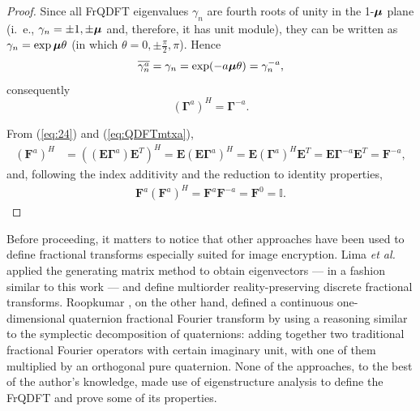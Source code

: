 \begin{itemize}
\begin{proof}
Since all FrQDFT eigenvalues $ \gamma_n $ are fourth roots of unity in the 1-$\boldsymbol{\mu} $ plane (i.~e., $ \gamma_n = \pm 1, \pm \boldsymbol{\mu} $ and, therefore, it has unit module), they can be written as $ \gamma_n = \exp \boldsymbol{\mu} \theta $ (in which $ \theta = 0, \pm \frac{\pi}{2}, \pi $). Hence
\begin{equation}
\overline{\gamma^a_n} = \gamma_n = \exp (-a \boldsymbol{\mu} \theta) = \gamma^{-a}_n,
\end{equation}
consequently
\begin{equation}
\label{eq:24}
(\mathbf{\Gamma}^a)^H = \mathbf{\Gamma}^{-a}.
\end{equation}

From (\ref{eq:24}) and (\ref{eq:QDFTmtxa}),
\begin{equation}
\begin{aligned}
(\mathbf{F}^a)^H &=  \left((\mathbf{E} \mathbf{\Gamma}^a) \mathbf{E}^T \right)^H =  \mathbf{E} \left(\mathbf{E} \mathbf{\Gamma}^a  \right)^H =
\mathbf{E} (\mathbf{\Gamma}^{a})^H \mathbf{E}^T = \mathbf{E} \mathbf{\Gamma}^{-a} \mathbf{E}^T = \mathbf{F}^{-a},
\end{aligned}
\end{equation}
and, following the index additivity and the reduction to identity properties,
\begin{equation}
\begin{aligned}
\mathbf{F}^a (\mathbf{F}^a)^H = \mathbf{F}^a \mathbf{F}^{-a} = \mathbf{F}^0= \mathbb{I}.
\end{aligned}
\end{equation}
\end{proof}
\end{itemize}

Before proceeding, it matters to notice that other approaches have been used to define fractional transforms especially suited for image encryption. Lima \textit{et al.} \cite{figueiredo2018} applied the generating matrix method to obtain eigenvectors --- in a fashion similar to this work --- and define multiorder reality-preserving discrete fractional transforms. Roopkumar \cite{roopkumar2016quaternionic}, on the other hand, defined a {continuous} one-dimensional quaternion fractional Fourier transform by using a reasoning similar to the symplectic decomposition of quaternions: adding together two traditional fractional Fourier operators with certain imaginary unit, with one of them multiplied by an orthogonal pure quaternion. None of the approaches, to the best of the author's knowledge, made use of eigenstructure analysis to define the FrQDFT and prove some of its properties.

